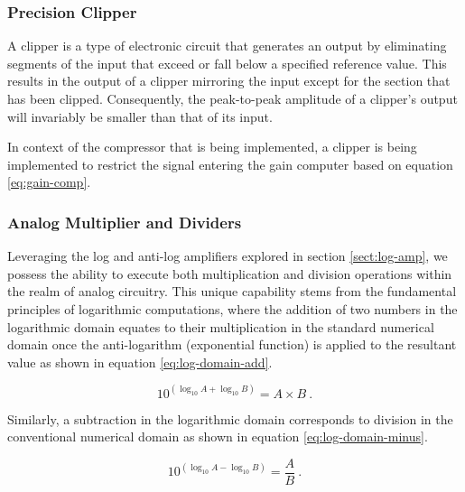 \documentclass[10pt]{article}
\begin{document}
\begin{multicols*}{2}
                \subsubsection{Precision Clipper}
                    A clipper is a type of electronic circuit that generates an output by eliminating segments of the input that exceed or fall below a specified reference value. This results in the output of a clipper mirroring the input except for the section that has been clipped. Consequently, the peak-to-peak amplitude of a clipper's output will invariably be smaller than that of its input.\par
                    In context of the compressor that is being implemented, a clipper is being implemented to restrict the signal entering the gain computer based on equation \ref{eq:gain-comp}.

                \subsubsection{Analog Multiplier and Dividers} \label{sec:analog-mul-and-div}
                    Leveraging the log and anti-log amplifiers explored in section \ref{sect:log-amp}, we possess the ability to execute both multiplication and division operations within the realm of analog circuitry. This unique capability stems from the fundamental principles of logarithmic computations, where the addition of two numbers in the logarithmic domain equates to their multiplication in the standard numerical domain once the anti-logarithm (exponential function) is applied to the resultant value as shown in equation \ref{eq:log-domain-add}.
                    
                        \begin{equation} \label{eq:log-domain-add}
                            10^{(\log_{10}A+\log_{10}B)}=A\times B\ .
                        \end{equation}
                    
                    \noindent Similarly, a subtraction in the logarithmic domain corresponds to division in the conventional numerical domain as shown in equation \ref{eq:log-domain-minus}.

                        \begin{equation} \label{eq:log-domain-minus}
                            10^{(\log_{10}A-\log_{10}B)}=\frac{A}{B}\ .
                        \end{equation}


\end{multicols*}
\end{document}
